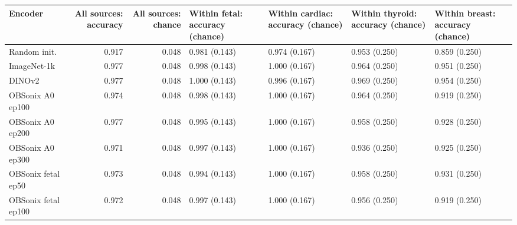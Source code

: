 \begin{tabular}{lrrllll}
\toprule
Encoder & All sources: accuracy & All sources: chance & Within fetal: accuracy (chance) & Within cardiac: accuracy (chance) & Within thyroid: accuracy (chance) & Within breast: accuracy (chance) \\
\midrule
Random init. & 0.917 & 0.048 & 0.981 (0.143) & 0.974 (0.167) & 0.953 (0.250) & 0.859 (0.250) \\
ImageNet-1k & 0.977 & 0.048 & 0.998 (0.143) & 1.000 (0.167) & 0.964 (0.250) & 0.951 (0.250) \\
DINOv2 & 0.977 & 0.048 & 1.000 (0.143) & 0.996 (0.167) & 0.969 (0.250) & 0.954 (0.250) \\
OBSonix A0 ep100 & 0.974 & 0.048 & 0.998 (0.143) & 1.000 (0.167) & 0.964 (0.250) & 0.919 (0.250) \\
OBSonix A0 ep200 & 0.977 & 0.048 & 0.995 (0.143) & 1.000 (0.167) & 0.958 (0.250) & 0.928 (0.250) \\
OBSonix A0 ep300 & 0.971 & 0.048 & 0.997 (0.143) & 1.000 (0.167) & 0.936 (0.250) & 0.925 (0.250) \\
OBSonix fetal ep50 & 0.973 & 0.048 & 0.994 (0.143) & 1.000 (0.167) & 0.958 (0.250) & 0.931 (0.250) \\
OBSonix fetal ep100 & 0.972 & 0.048 & 0.997 (0.143) & 1.000 (0.167) & 0.956 (0.250) & 0.919 (0.250) \\
\bottomrule
\end{tabular}
